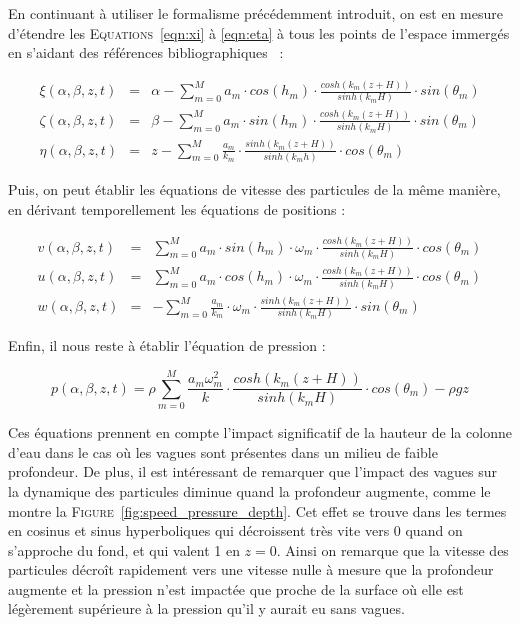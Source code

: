 				En continuant à utiliser le formalisme précédemment introduit, on est en mesure d'étendre les \textsc{Equations}~\ref{eqn:xi} à \ref{eqn:eta} à tous les points de l'espace immergés en s'aidant des références bibliographiques~\cite{dean1991water, MIT_Waves} :

				\begin{eqnarray}
					\xi(\alpha, \beta, z, t) & = & \alpha - \sum_{m=0}^{M} a_m \cdot cos(h_m) \cdot \frac{cosh(k_m(z+H))}{sinh(k_m H)} \cdot sin(\theta_m) \\
					\zeta(\alpha, \beta, z, t) & = & \beta - \sum_{m=0}^{M} a_m \cdot sin(h_m) \cdot \frac{cosh(k_m(z+H))}{sinh(k_m H)} \cdot sin(\theta_m) \\
					\eta(\alpha, \beta, z, t) & = & z - \sum_{m=0}^{M} \frac{a_m}{k_m} \cdot \frac{sinh(k_m(z+H))}{sinh(k_mh)} \cdot cos(\theta_m)
				\end{eqnarray}

				Puis, on peut établir les équations de vitesse des particules de la même manière, en dérivant temporellement les équations de positions :
		
				\begin{eqnarray}
					v(\alpha, \beta, z, t) & = & \sum_{m=0}^{M} a_m \cdot sin(h_m) \cdot \omega_m \cdot \frac{cosh(k_m(z+H))}{sinh(k_m H)} \cdot cos(\theta_m) \\
					u(\alpha, \beta, z, t) & = & \sum_{m=0}^{M} a_m \cdot cos(h_m) \cdot \omega_m \cdot \frac{cosh(k_m(z+H))}{sinh(k_m H)} \cdot cos(\theta_m) \\
					w(\alpha, \beta, z, t) & = & - \sum_{m=0}^{M} \frac{a_m}{k_m} \cdot \omega_m \cdot \frac{sinh(k_m(z+H))}{sinh(k_m H)} \cdot sin(\theta_m)
				\end{eqnarray}

				Enfin, il nous reste à établir l'équation de pression :

				\begin{equation}
					p(\alpha, \beta, z, t) = \rho \sum_{m=0}^{M} \frac{a_m\omega_m^2}{k} \cdot \frac{cosh(k_m(z+H))}{sinh(k_m H)} \cdot cos(\theta_m) - \rho g z
				\end{equation}

				Ces équations prennent en compte l'impact significatif de la hauteur de la colonne d'eau dans le cas où les vagues sont présentes dans un milieu de faible profondeur. De plus, il est intéressant de remarquer que l'impact des vagues sur la dynamique des particules diminue quand la profondeur augmente, comme le montre la \textsc{Figure}~\ref{fig:speed_pressure_depth}. Cet effet se trouve dans les termes en cosinus et sinus hyperboliques qui décroissent très vite vers 0 quand on s'approche du fond, et qui valent 1 en $z=0$. Ainsi on remarque que la vitesse des particules décroît rapidement vers une vitesse nulle à mesure que la profondeur augmente et la pression n'est impactée que proche de la surface où elle est légèrement supérieure à la pression qu'il y aurait eu sans vagues.

